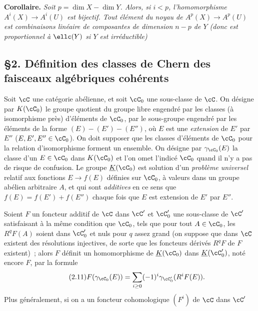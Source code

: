 \textbf{Corollaire.} \emph{Soit $p=\dim X-\dim Y$. Alors, si $i<p$, l'homomorphisme $A^i(X)\longrightarrow A^i(U)$ est bijectif. Tout élément du noyau de $A^p(X)\longrightarrow A^p(U)$ est combinaisons linéaire de composantes de dimension $n-p$ de $Y$ (donc est proportionnel à $\ellc(Y)$ si $Y$ est irréductible)}

\subsection*{\S 2. Définition des classes de Chern des faisceaux algébriques cohérents}

Soit $\cC$ une catégorie abélienne, et soit $\cC_0$ une sous-classe de $\cC$. On désigne par $K(\cC_0)$ le groupe quotient du groupe libre engendré par les classes (à isomorphisme près) d'éléments de $\cC_0$, par le sous-groupe engendré par les éléments de la forme $(E)-(E')-(E'')$, où $E$ est une \emph{extension} de $E'$ par $E''$ ($E,E',E''\in\cC_0$). On doit supposer que les classes d'éléments de $\cC_0$ pour la relation d'isomorphisme forment un ensemble. On désigne par $\gamma_{\cC_0}(E)$ la classe d'un $E\in\cC_0$ dans $K(\cC_0)$ et l'on omet l'indicé $\cC_0$ quand il n'y a pas de risque de confusion. Le groupe $\underline{K}(\cC_0)$ est solution d'un \emph{problème universel} relatif aux fonctions $E\longrightarrow f(E)$ définies sur $\cC_0$, à valeurs dans un groupe abélien arbitraire $A$, et qui sont \emph{additives} en ce sens que $f(E)=f(E')+f(E'')$ chaque fois que $E$ est extension de $E'$ par $E''$.

Soient $F$ un foncteur additif de $\cC$ dans $\cC'$ et $\cC'_0$ une sous-classe de $\cC'$ satisfaisant à la même condition que $\cC_0$, tels que pour tout $A\in\cC_0$, les $R^qF(A)$ soient dans $\cC'_0$ et nuls pour $q$ assez grand (on suppose que dans $\cC$ existent des résolutions injectives, de sorte que les foncteurs dérivés $R^qF$ de $F$ existent)~; alors $F$ définit un homomorphisme de $\underline{K}(\cC_0)$ dans $\underline{K}(\cC'_0)$, noté encore $F$, par la formule
\begin{equation}\tag{2.11}
 F(\gamma_{\cC_0}(E))=\sum_{i\geq 0}(-1)^i\gamma_{\cC'_0}(R^iF(E)).
\end{equation}
Plus généralement, si on a un foncteur cohomologique $(F^i)$ de $\cC$ dans $\cC'$ 

